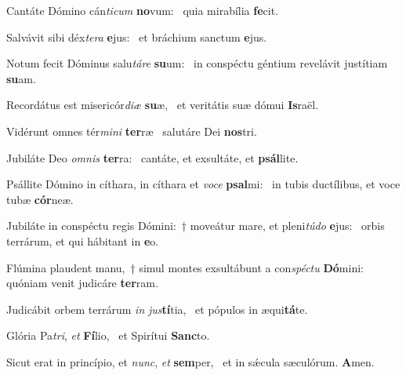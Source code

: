\item Cantáte Dómino cán\textit{ticum} \textbf{no}vum:~\psstar{} quia mirabília \textbf{fe}cit.
\item Salvávit sibi déx\textit{tera} \textbf{e}jus:~\psstar{} et bráchium sanctum \textbf{e}jus.
\item Notum fecit Dóminus salu\textit{táre} \textbf{su}um:~\psstar{} in conspéctu géntium revelávit justítiam \textbf{su}am.
\item Recordátus est misericór\textit{diæ} \textbf{su}æ,~\psstar{} et veritátis suæ dómui \textbf{Is}raël.
\item Vidérunt omnes tér\textit{mini} \textbf{ter}ræ~\psstar{} salutáre Dei \textbf{nos}tri.
\item Jubiláte Deo \textit{omnis} \textbf{ter}ra:~\psstar{} cantáte, et exsultáte, et \textbf{psál}lite.
\item Psállite Dómino in cíthara, in cíthara et \textit{voce} \textbf{psal}mi:~\psstar{} in tubis ductílibus, et voce tubæ \textbf{cór}neæ.
\item Jubiláte in conspéctu regis Dómini:~† moveátur mare, et pleni\textit{túdo} \textbf{e}jus:~\psstar{} orbis terrárum, et qui hábitant in \textbf{e}o.
\item Flúmina plaudent manu,~† simul montes exsultábunt a con\textit{spéctu} \textbf{Dó}mini:~\psstar{} quóniam venit judicáre \textbf{ter}ram.
\item Judicábit orbem terrárum \textit{in} \textit{jus}\textbf{tí}tia,~\psstar{} et pópulos in æqui\textbf{tá}te.
\item Glória Pa\textit{tri}, \textit{et} \textbf{Fí}lio,~\psstar{} et Spirítui \textbf{Sanc}to.
\item Sicut erat in princípio, et \textit{nunc}, \textit{et} \textbf{sem}per,~\psstar{} et in sǽcula sæculórum. \textbf{A}men.